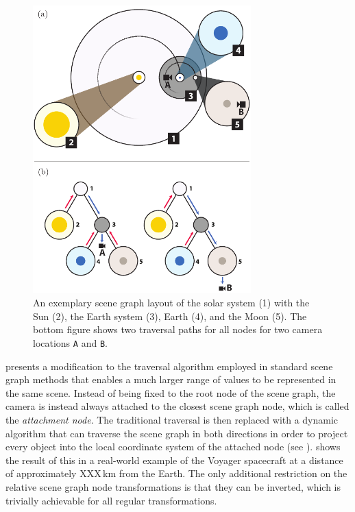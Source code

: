 \begin{figure}
\centering
\includegraphics[width=0.75\textwidth]{figures/contributions/dsg/scenegraph.pdf}
\caption{An exemplary scene graph layout of the solar system (1) with the Sun (2), the Earth system (3), Earth (4), and the Moon (5). The bottom figure shows two traversal paths for all nodes for two camera locations \texttt{A} and \texttt{B}.}
\label{contributions:astro:dsg:scenegraph}
\end{figure}

 presents a modification to the traversal algorithm employed in standard scene graph methods that enables a much larger range of values to be represented in the same scene.  Instead of being fixed to the root node of the scene graph, the camera is instead always attached to the closest scene graph node, which is called the \emph{attachment node}.  The traditional traversal is then replaced with a dynamic algorithm that can traverse the scene graph in both directions in order to project every object into the local coordinate system of the attached node (see ).   shows the result of this in a real-world example of the Voyager spacecraft at a distance of approximately XXX\,km from the Earth.  The only additional restriction on the relative scene graph node transformations is that they can be inverted, which is trivially achievable for all regular transformations.

